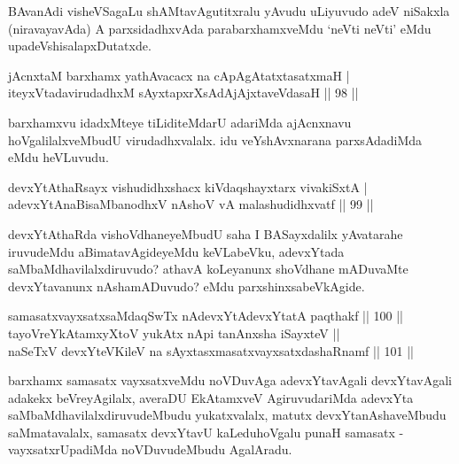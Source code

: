 \begin{artha}
BAvanAdi visheVSagaLu shAMtavAgutitxralu yAvudu uLiyuvudo adeV niSakxla (niravayavAda) A parxsidadhxvAda parabarxhamxveMdu `neVti neVti' eMdu upadeVshisalapxDutatxde.
\end{artha}

\begin{shl}
jAcnxtaM barxhamx yathAvacacx na cApAgAtatxtasatxmaH |\\
iteyxVtadavirudadhxM sAyxtapxrXsAdAjAjxtaveVdasaH \hfill || 98 ||
\end{shl}

\begin{artha}
barxhamxvu idadxMteye tiLiditeMdarU adariMda ajAcnxnavu hoVgalilalxveMbudU virudadhxvalalx. idu veYshAvxnarana parxsAdadiMda eMdu heVLuvudu.
\end{artha}


\begin{shl}
devxYtAthaRsayx vishudidhxshacx kiVdaqshayxtarx vivakiSxtA |\\
adevxYtAnaBisaMbanodhxV nAshoV vA malashudidhxvatf \hfill || 99 ||
\end{shl}

\begin{artha}
devxYtAthaRda vishoVdhaneyeMbudU saha I BASayxdalilx yAvatarahe iruvudeMdu aBimatavAgideyeMdu keVLabeVku, adevxYtada saMbaMdhavilalxdiruvudo? athavA koLeyanunx shoVdhane mADuvaMte devxYtavanunx nAshamADuvudo? eMdu parxshinxsabeVkAgide.
\end{artha}


\begin{shl}
samasatxvayxsatxsaMdaqSwTx nAdevxYtAdevxYtatA paqthakf \hfill || 100 ||\\
tayoVreYkAtamxyXtoV yukAtx nApi tanAnxsha iSayxteV ||\\
naSeTxV devxYteV\s KileV na sAyxtasxmasatxvayxsatxdashaRnamf \hfill || 101 ||
\end{shl}

\begin{artha}
barxhamx samasatx vayxsatxveMdu noVDuvAga adevxYtavAgali devxYtavAgali adakekx beVreyAgilalx, averaDU EkAtamxveV AgiruvudariMda adevxYta saMbaMdhavilalxdiruvudeMbudu yukatxvalalx, matutx devxYtanAshaveMbudu saMmatavalalx, samasatx devxYtavU kaLeduhoVgalu punaH samasatx - vayxsatxrUpadiMda noVDuvudeMbudu AgalAradu.
\end{artha}

